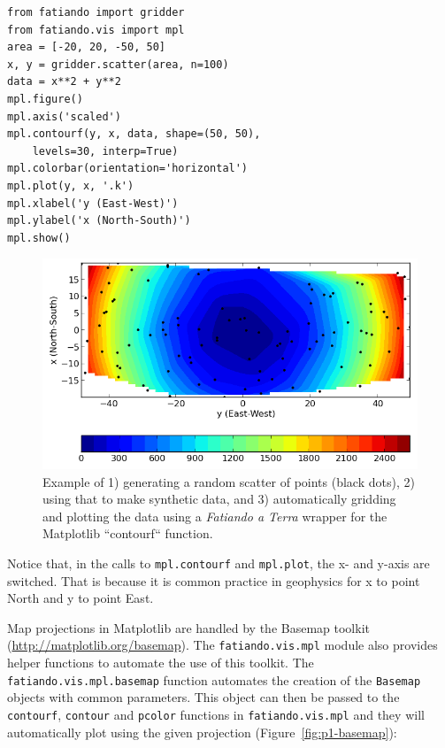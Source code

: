 \begin{verbatim}
from fatiando import gridder
from fatiando.vis import mpl
area = [-20, 20, -50, 50]
x, y = gridder.scatter(area, n=100)
data = x**2 + y**2
mpl.figure()
mpl.axis('scaled')
mpl.contourf(y, x, data, shape=(50, 50),
    levels=30, interp=True)
mpl.colorbar(orientation='horizontal')
mpl.plot(y, x, '.k')
mpl.xlabel('y (East-West)')
mpl.ylabel('x (North-South)')
mpl.show()
\end{verbatim}


\begin{figure}
    \centering
    \includegraphics[width=\textwidth]{figures/paper-fatiando/gridding_plotting_contourf}
    \caption{
    Example of 1) generating a random scatter of points (black dots),
    2) using that to make synthetic data, and
    3) automatically gridding and plotting the data using a
    \textit{Fatiando a Terra} wrapper for the Matplotlib ``contourf``
    function.
    }
    \label{fig:p1-contourf}
\end{figure}


Notice that, in the calls to \texttt{mpl.contourf} and
\texttt{mpl.plot}, the x- and y-axis are switched. That is because it is
common practice in geophysics for x to point North and y to point East.

Map projections in Matplotlib are handled by the
Basemap toolkit (\url{http://matplotlib.org/basemap}). The
\texttt{fatiando.vis.mpl} module also provides helper functions to
automate the use of this toolkit. The \texttt{fatiando.vis.mpl.basemap}
function automates the creation of the \texttt{Basemap} objects with
common parameters. This object can then be passed to the
\texttt{contourf}, \texttt{contour} and \texttt{pcolor} functions in
\texttt{fatiando.vis.mpl} and they will automatically plot using the
given projection (Figure~\ref{fig:p1-basemap}):

